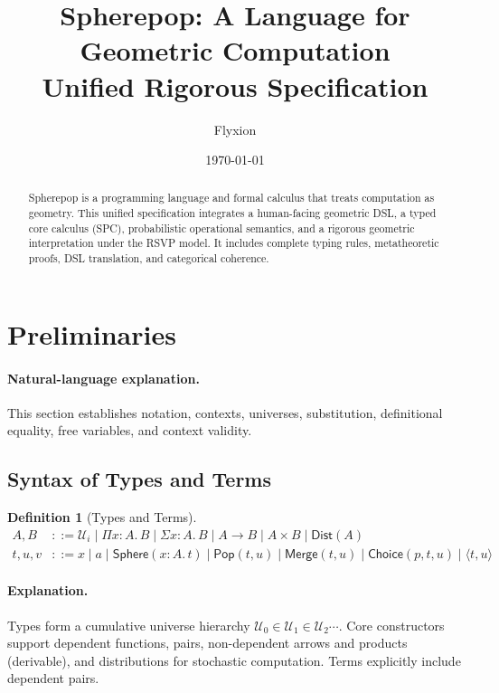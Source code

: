 \documentclass[12pt]{article}
\title{Spherepop: A Language for Geometric Computation\\
       \large Unified Rigorous Specification}
\author{Flyxion}
\date{\today}
\newcommand{\Sphere}{\mathsf{Sphere}}
\newcommand{\Pop}{\mathsf{Pop}}
\newcommand{\Merge}{\mathsf{Merge}}
\newcommand{\Choice}{\mathsf{Choice}}
\newcommand{\Pair}[2]{\langle #1, #2 \rangle}
\newcommand{\UU}[1]{\mathcal{U}_{#1}}
\newcommand{\PiT}[3]{\Pi #1 : #2.\, #3}
\newcommand{\SigT}[3]{\Sigma #1 : #2.\, #3}
\newcommand{\Dist}[1]{\mathsf{Dist}(#1)}
\theoremstyle{definition}
\newtheorem{definition}{Definition}
\begin{document}
\maketitle
\hypersetup{pdfencoding=unicode}  %
\tableofcontents

\begin{abstract}
Spherepop is a programming language and formal calculus that treats
computation as geometry. This unified specification integrates a
human-facing geometric DSL, a typed core calculus (SPC), probabilistic
operational semantics, and a rigorous geometric interpretation under
the RSVP model. It includes complete typing rules, metatheoretic
proofs, DSL translation, and categorical coherence.
\end{abstract}

\section{Preliminaries}
\paragraph{Natural-language explanation.}
This section establishes notation, contexts, universes, substitution,
definitional equality, free variables, and context validity.

\subsection{Syntax of Types and Terms}
\begin{definition}[Types and Terms]
\begin{align*}
A,B &::= \UU{i} \mid \PiT{x}{A}{B} \mid \SigT{x}{A}{B} \mid A \to B \mid A \times B \mid \Dist{A} \\
t,u,v &::= x \mid a \mid \Sphere(x\!:\!A.\,t) \mid \Pop(t,u) \mid \Merge(t,u) \mid \Choice(p,t,u) \mid \Pair{t}{u}
\end{align*}
\end{definition}

\paragraph{Explanation.} Types form a cumulative universe hierarchy $\UU{0} \in \UU{1} \in \UU{2} \cdots$. Core constructors support dependent functions, pairs, non-dependent arrows and products (derivable), and distributions for stochastic computation. Terms explicitly include dependent pairs.
\end{document}
